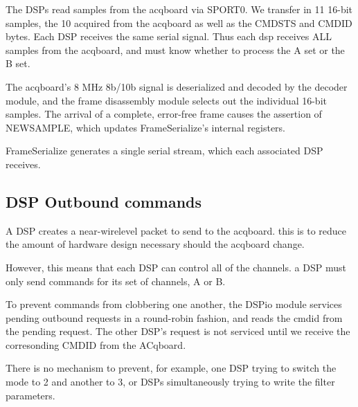 The DSPs read samples from the acqboard via SPORT0. We transfer in 11
16-bit samples, the 10 acquired from the acqboard as well as the
CMDSTS and CMDID bytes. Each DSP receives the same serial signal. Thus
each dsp receives ALL samples from the acqboard, and must know whether
to process the A set or the B set.

The acqboard's 8 MHz 8b/10b signal is deserialized and decoded by the
decoder module, and the frame disassembly module selects out the
individual 16-bit samples. The arrival of a complete, error-free frame
causes the assertion of NEWSAMPLE, which updates FrameSerialize's
internal registers.

FrameSerialize generates a single serial stream, which each associated
DSP receives.

\subsection{DSP Outbound commands}
A DSP creates a near-wirelevel packet to send to the acqboard. this is
to reduce the amount of hardware design necessary should the acqboard
change.

However, this means that each DSP can control all of the channels. a DSP must only send commands for its set of channels, A or B. 

To prevent commands from clobbering one another, the DSPio module services pending outbound requests in a round-robin fashion, and reads the cmdid from the pending request. The other DSP's request is not serviced until we receive the corresonding CMDID from the ACqboard. 

There is no mechanism to prevent, for example, one DSP trying to
switch the mode to 2 and another to 3, or DSPs simultaneously trying
to write the filter parameters.
